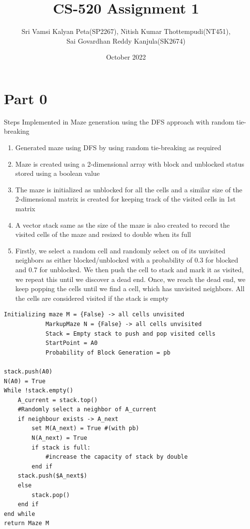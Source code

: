 \documentclass{article}
\title{CS-520 Assignment 1}
\author{Sri Vamsi Kalyan Peta(SP2267), Nitish Kumar Thottempudi(NT451),\\Sai Govardhan Reddy Kanjula(SK2674)}
\date{October 2022}
\begin{document}
\maketitle
\setlength{\parindent}{20pt}
\section*{Part 0}
Steps Implemented in Maze generation using the DFS approach with random tie-breaking
\begin{enumerate}
    \item Generated maze using DFS by using random tie-breaking as required
    \item Maze is created using a 2-dimensional array with block and unblocked status stored using a boolean value
    \item The maze is initialized as unblocked for all the cells and a similar size of the 2-dimensional matrix is created for keeping track of the visited cells in 1st matrix
    \item A vector stack same as the size of the maze is also created to record the visited cells of the maze and resized to double when its full
    \item Firstly, we select a random cell and randomly select on of its unvisited neighbors as either blocked/unblocked with a probability of 0.3 for blocked and 0.7 for unblocked. We then push the cell to stack and mark it as visited, we repeat this until we discover a dead end. Once, we reach the dead end, we keep popping the cells until we find a cell, which has unvisited neighbors. All the cells are considered visited if the stack is empty
\end{enumerate}
\begin{lstlisting}[title=Maze generation using DFS approach with random tie-breaking]
Initializing maze M = {False} -> all cells unvisited
            MarkupMaze N = {False} -> all cells unvisited
            Stack = Empty stack to push and pop visited cells
            StartPoint = A0
            Probability of Block Generation = pb

stack.push(A0)
N(A0) = True
While !stack.empty() 
    A_current = stack.top() 
    #Randomly select a neighbor of A_current
    if neighbour exists -> A_next
        set M(A_next) = True #(with pb)
        N(A_next) = True
        if stack is full:
            #increase the capacity of stack by double
        end if
    stack.push($A_next$)
    else
        stack.pop()
    end if
end while
return Maze M
\end{lstlisting}
\end{document}
